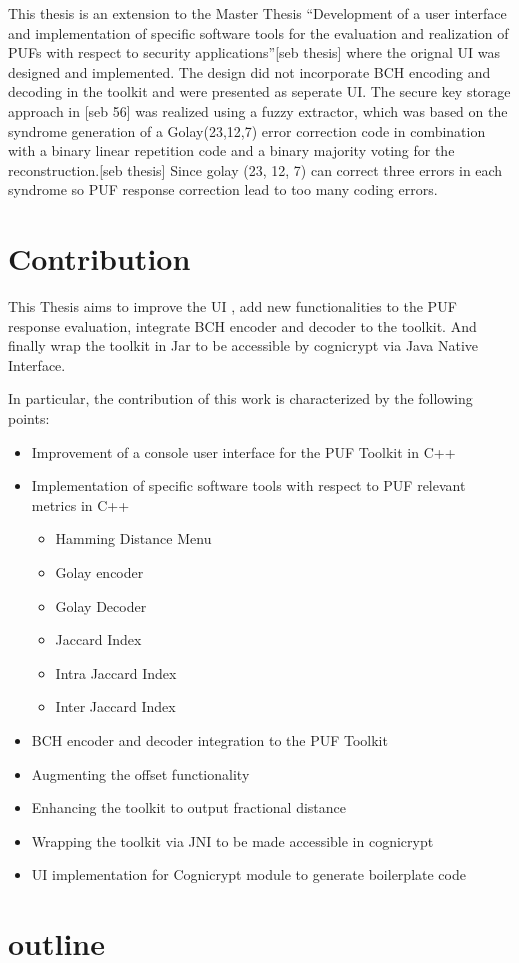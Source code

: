 This thesis is an extension to the Master Thesis ``Development of a user interface and implementation of specific software tools for the evaluation and realization of PUFs with respect to security applications''[seb thesis]	where the orignal UI was designed and implemented. The design did not incorporate BCH encoding and decoding in the toolkit and were presented as seperate UI. The secure key storage approach in [seb 56] was realized using a fuzzy extractor, which was based on the syndrome generation of a Golay(23,12,7) error correction code in combination with a binary linear repetition code and a binary majority voting for the reconstruction.[seb thesis]  Since golay (23, 12, 7) can correct three errors in each syndrome so PUF response correction lead to too many coding errors.

\section{Contribution}
This Thesis aims to improve the UI , add new functionalities to the PUF response evaluation, integrate BCH encoder and decoder to the toolkit.
And finally wrap the toolkit in Jar to be accessible by cognicrypt via Java Native Interface.

In particular, the contribution of this work is characterized by the following points:

\begin{itemize}
	\item Improvement of a console user interface for the PUF Toolkit in C++
	\item Implementation of specific software tools with respect to PUF relevant metrics in C++
		\begin{itemize}
			\item Hamming Distance Menu
			\item Golay encoder 
			\item Golay Decoder
			\item Jaccard Index 
			\item Intra Jaccard Index
			\item Inter Jaccard Index
		\end{itemize}
	\item BCH encoder and decoder integration to the PUF Toolkit
	\item Augmenting the offset functionality
	\item Enhancing the toolkit to output fractional distance
	\item Wrapping the toolkit via JNI to be made accessible in cognicrypt
	\item UI implementation for Cognicrypt module to generate boilerplate code
\end{itemize}

\section{outline}
